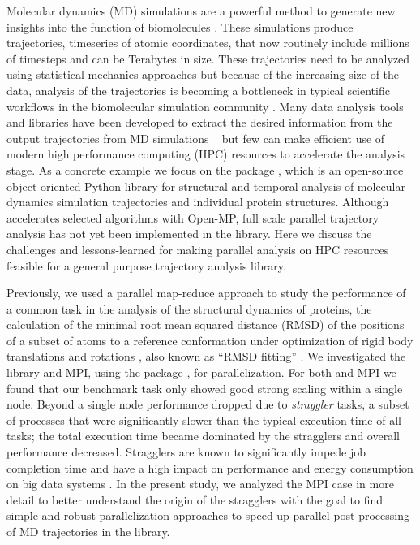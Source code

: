 \label{sec:introduction}
Molecular dynamics (MD) simulations are a powerful method to generate new insights into the function of biomolecules \citep{Borhani:2012mi, Dror:2012cr, Orozco:2014dq, Perilla:2015kx, Bottaro:2018aa}.
These simulations produce trajectories, timeseries of atomic coordinates, that now routinely include millions of timesteps and can be Terabytes in size.
These trajectories need to be analyzed using statistical mechanics approaches \cite{Mura:2014kx} but because of the increasing size of the data, analysis of the trajectories is becoming a bottleneck in typical scientific workflows in the biomolecular simulation community \cite{Cheatham:2015}.
Many data analysis tools and libraries have been developed to extract the desired information from the output trajectories from MD simulations ~\cite{nmoldyn, nmoldyn-2012, Hum96, Hinsen:2000kx, Grant:2006ud, himach-2008, Romo:2009zr, Romo:2014bh, Michaud-Agrawal:2011fu, Gowers:2016aa, cpptraj-2013, mdtraj-2015, pteros2015, Doerr:2016aa} but few can make efficient use of modern high performance computing (HPC) resources to accelerate the analysis stage.
As a concrete example we focus on the  package \citep{Gowers:2016aa,Michaud-Agrawal:2011fu}, which is an open-source object-oriented Python library for structural and temporal analysis of molecular dynamics simulation trajectories and individual protein structures.
Although  accelerates selected algorithms with Open-MP, full scale parallel trajectory analysis has not yet been implemented in the library.
Here we discuss the challenges and lessons-learned for making parallel analysis on HPC resources feasible for a general purpose trajectory analysis library.

Previously, we used a parallel map-reduce approach to study the performance of a common task in the analysis of the structural dynamics of proteins, the calculation of the minimal root mean squared distance (RMSD) of the positions of a subset of atoms to a reference conformation under optimization of rigid body translations and rotations \cite{Khoshlessan:2017ab, ICCP-2018}, also known as ``RMSD fitting'' \cite{Liu:2010kx, Mura:2014kx}. 
We investigated the  library \cite{Rocklin:2015aa} and MPI, using the  package \cite{Dalcin:2011aa, Dalcin:2005aa}, for parallelization. 
For both  and MPI we found that our benchmark task only showed good strong scaling within a single node.
Beyond a single node performance dropped due to \emph{straggler} tasks, a subset of processes that were significantly slower than the typical execution time of all tasks; the total execution time became dominated by the stragglers and overall performance decreased.
Stragglers are known to significantly impede job completion time \cite{Garraghan2016} and have a high impact on performance and energy consumption on big data systems \cite{Tien-2017}.
In the present study, we analyzed the MPI case in more detail to better understand the origin of the stragglers with the goal to find simple and robust parallelization approaches to speed up parallel post-processing of MD trajectories in the  library. 

